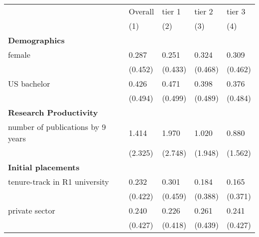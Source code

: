 \begin{table}[ht]
	\centering
	\begin{adjustbox}{max width=0.75\textwidth}
		\begin{tabular}{lllll}
			\hline\hline
			& Overall & tier 1 & tier 2 & tier 3 \\ 
			& (1)  & (2)  & (3) & (4) \\
			\hline
			\textbf{Demographics} &         &        &        &        \\
			female                              & 0.287  &  0.251  & 0.324 &0.309   \\
			& (0.452)  & (0.433) & (0.468) & (0.462) \\
			US bachelor                         & 0.426  & 0.471 & 0.398 & 0.376 \\
			& (0.494)  & (0.499) & (0.489) & (0.484) \\
			\textbf{Research Productivity}     &         &        &        &        \\
			number of publications by 9 years &  1.414 & 1.970 &  1.020 & 0.880 \\
			&  (2.325) & (2.748) & (1.948) & (1.562) \\
			\textbf{Initial placements}     &         &        &        &        \\
			tenure-track in R1 university                           & 0.232  & 0.301 & 0.184 & 0.165 \\
			& (0.422)  & (0.459) & (0.388) & (0.371) \\
			private sector                      & 0.240  & 0.226 & 0.261 & 0.241 \\
			& (0.427)    & (0.418) & (0.439) & (0.427) \\ 
			

\end{tabular}
\end{adjustbox}
\end{table}
